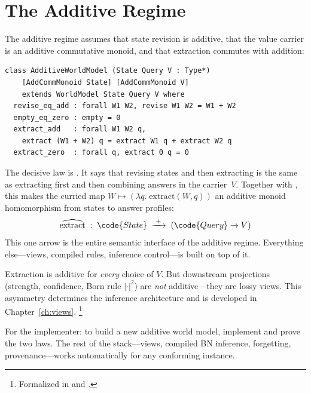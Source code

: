 \documentclass[11pt,openany]{report}
\begin{document}
\section{The Additive Regime}
\label{sec:additive-regime}

The additive regime assumes that state revision is additive, that the
value carrier is an additive commutative monoid, and that extraction
commutes with addition:

\begin{lstlisting}[language={}]
class AdditiveWorldModel (State Query V : Type*)
    [AddCommMonoid State] [AddCommMonoid V]
    extends WorldModel State Query V where
  revise_eq_add : forall W1 W2, revise W1 W2 = W1 + W2
  empty_eq_zero : empty = 0
  extract_add   : forall W1 W2 q,
    extract (W1 + W2) q = extract W1 q + extract W2 q
  extract_zero  : forall q, extract 0 q = 0
\end{lstlisting}

\noindent
The decisive law is .  It says that revising states
and then extracting is the same as extracting first and then combining
answers in the carrier~$V$.  Together with , this
makes the curried map
$W \mapsto (\lambda q.\; \mathrm{extract}(W, q))$ an additive monoid
homomorphism from states to answer profiles:
\[
  \widehat{\mathrm{extract}} \;:\;
  \code{State} \;\xrightarrow{\;+\;}\;
  (\code{Query} \to V)
\]
This one arrow is the entire semantic interface of the additive regime.
Everything else---views, compiled rules, inference control---is built
on top of it.

Extraction is additive for \emph{every} choice of $V$.  But downstream
projections (strength, confidence, Born rule $|\cdot|^2$) are
\emph{not} additive---they are lossy views.%
This asymmetry determines
the inference architecture and is developed in
Chapter~\ref{ch:views}.%
\footnote{Formalized in
and .}

For the implementer: to build a new additive world model, implement
 and prove the two laws.  The rest of the stack---views,
compiled BN inference, forgetting, provenance---works automatically for
any conforming instance.
\end{document}
